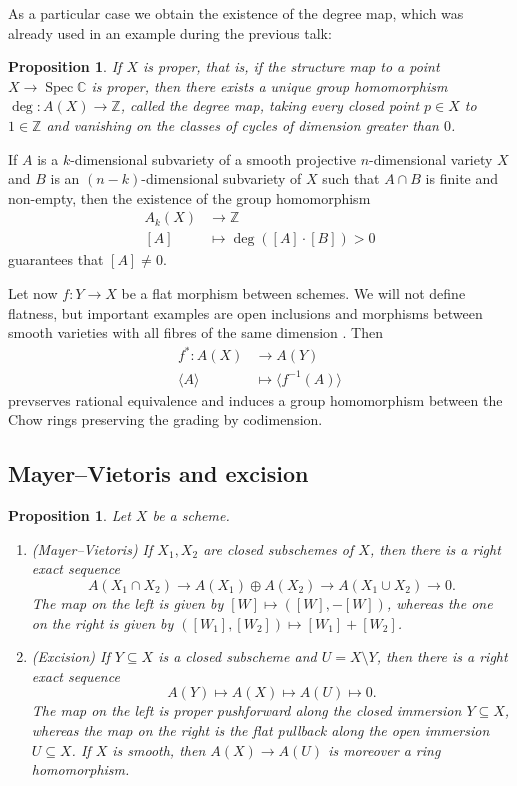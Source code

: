 \documentclass[12pt,a4paper]{amsart}
\theoremstyle{plain}
\newtheorem{prop}[thm]{Proposition}
\theoremstyle{definition}
\theoremstyle{remark}
\begin{document}
As a particular case we obtain the existence of the degree map, which was already used in an example during the previous talk:

\begin{prop}
    If $X$ is proper, that is, if the structure map to a point $X\to \operatorname{Spec}{\mathbb{C}}$ is proper, then there exists a unique group homomorphism $\deg\colon A(X)\to \mathbb{Z}$, called the \textit{degree map}, taking every closed point $p\in X$ to $1\in\mathbb{Z}$ and vanishing on the classes of cycles of dimension greater than $0$.
\end{prop}

If $A$ is a $k$-dimensional subvariety of a smooth projective $n$-dimensional variety $X$ and $B$ is an $(n-k)$-dimensional subvariety of $X$ such that $A\cap B$ is finite and non-empty, then the existence of the group homomorphism
\begin{align*}
    A_{k}(X) & \longrightarrow \mathbb{Z} \\
    [A] & \longmapsto \deg([A]\cdot [B])>0
\end{align*}
guarantees that $[A]\neq 0$.

Let now $f\colon Y\to X$ be a flat morphism between schemes.
We will not define flatness, but important examples are open inclusions and morphisms between smooth varieties with all fibres of the same dimension \cite[Corollary 14.128]{gw10}.
Then
\begin{align*}
    f^{*}\colon A(X) & \longrightarrow A(Y) \\
    \langle A\rangle & \longmapsto \langle f^{-1}(A)\rangle
\end{align*}
prevserves rational equivalence and induces a group homomorphism between the Chow rings preserving the grading by codimension.

\subsection{Mayer--Vietoris and excision \cite[\S 1.3.4]{eh16}}

\begin{prop}
    Let $X$ be a scheme.
    \begin{enumerate}[label=(\alph*)]
	\item \textit{(Mayer--Vietoris)} If $X_{1},X_{2}$ are closed subschemes of $X$, then there is a right exact sequence
	    \[ A(X_{1}\cap X_{2})\to A(X_{1})\oplus A(X_{2})\to A(X_{1}\cup X_{2})\to 0. \]
	    The map on the left is given by $[W]\mapsto ([W],-[W])$, whereas the one on the right is given by $([W_{1}],[W_{2}])\mapsto [W_{1}]+[W_{2}]$.
	\item \textit{(Excision)} If $Y\subseteq X$ is a closed subscheme and $U=X\setminus Y$, then there is a right exact sequence
	    \[ A(Y)\mapsto A(X)\mapsto A(U)\mapsto 0. \]
	    The map on the left is proper pushforward along the closed immersion $Y\subseteq X$, whereas the map on the right is the flat pullback along the open immersion $U\subseteq X$.
	    If $X$ is smooth, then $A(X)\to A(U)$ is moreover a ring homomorphism.
    \end{enumerate}
\end{prop}
\end{document}
